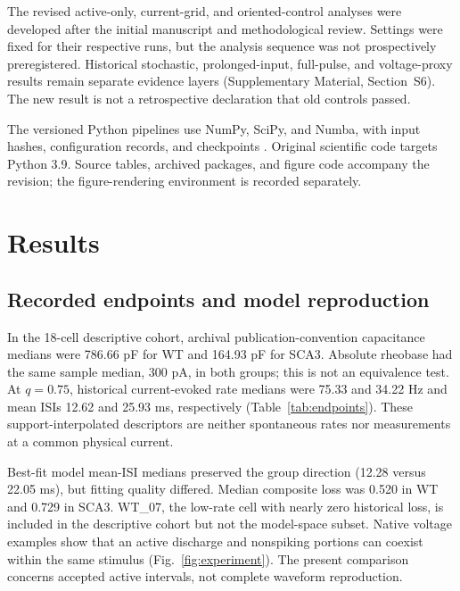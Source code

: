 \documentclass[utf8]{FrontiersinHarvard}
\newcommand{\sref}[1]{Supplementary Material, Section~#1}
\begin{document}
The revised active-only, current-grid, and oriented-control analyses were developed after the initial manuscript and methodological review. Settings were fixed for their respective runs, but the analysis sequence was not prospectively preregistered. Historical stochastic, prolonged-input, full-pulse, and voltage-proxy results remain separate evidence layers (\sref{S6}). The new result is not a retrospective declaration that old controls passed.

The versioned Python pipelines use NumPy, SciPy, and Numba, with input hashes, configuration records, and checkpoints \citep{harris2020,virtanen2020,lam2015}. Original scientific code targets Python 3.9. Source tables, archived packages, and figure code accompany the revision; the figure-rendering environment is recorded separately.

\section{Results}\label{sec:results}
\subsection{Recorded endpoints and model reproduction}\label{sec:endpoints}
In the 18-cell descriptive cohort, archival publication-convention capacitance medians were 786.66 pF for WT and 164.93 pF for SCA3. Absolute rheobase had the same sample median, 300 pA, in both groups; this is not an equivalence test. At $q=0.75$, historical current-evoked rate medians were 75.33 and 34.22 Hz and mean ISIs 12.62 and 25.93 ms, respectively (Table~\ref{tab:endpoints}). These support-interpolated descriptors are neither spontaneous rates nor measurements at a common physical current.

Best-fit model mean-ISI medians preserved the group direction (12.28 versus 22.05 ms), but fitting quality differed. Median composite loss was 0.520 in WT and 0.729 in SCA3. WT\_07, the low-rate cell with nearly zero historical loss, is included in the descriptive cohort but not the model-space subset. Native voltage examples show that an active discharge and nonspiking portions can coexist within the same stimulus (Fig.~\ref{fig:experiment}). The present comparison concerns accepted active intervals, not complete waveform reproduction.
\end{document}
